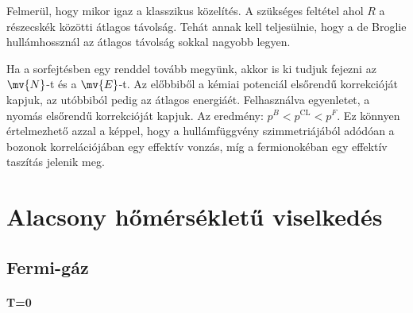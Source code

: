   Felmerül, hogy mikor igaz a klasszikus közelítés.
   A szükséges feltétel
  ahol $R$ a részecskék közötti átlagos távolság.
   Tehát annak kell teljesülnie, hogy a de Broglie hullámhossznál az átlagos távolság sokkal nagyobb legyen.
  
  Ha a sorfejtésben egy renddel tovább megyünk, akkor is ki tudjuk fejezni az $\mv{N}$-t és a $\mv{E}$-t.
   Az előbbiből a kémiai potenciál elsőrendű korrekcióját kapjuk, az utóbbiból pedig az átlagos energiáét.
   Felhasználva  egyenletet, a nyomás elsőrendű korrekcióját kapjuk.
   Az eredmény: $p^B<p^{\text{CL}}<p^F$.
   Ez könnyen értelmezhető azzal a képpel, hogy a hullámfüggvény szimmetriájából adódóan a bozonok korrelációjában egy effektív vonzás, míg a fermionokéban egy effektív taszítás jelenik meg. 

 \section{Alacsony hőmérsékletű viselkedés}
  
  \subsection{Fermi-gáz}
  
   \paragraph{T=0}
    
